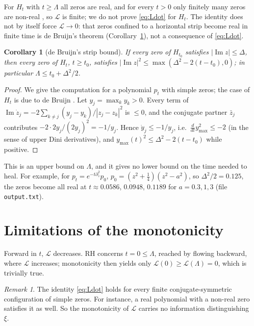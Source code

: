\documentclass[11pt]{amsart}
\newtheorem{corollary}[theorem]{Corollary}
\theoremstyle{definition}
\theoremstyle{remark}
\newtheorem{remark}[theorem]{Remark}
\newcommand{\im}{\operatorname{Im}}
\newcommand{\Lyap}{\mathcal L}
\begin{document}
For $H_t$ with $t\ge\Lambda$ all zeros are real, and for every $t>0$ only finitely many zeros are
non-real \cite{KKL}, so $\Lyap$ is finite; we do not prove \eqref{eq:Ldot} for $H_t$. The identity does not
by itself force $\Lyap\to0$: that zeros confined to a horizontal strip become real in finite time is de Bruijn's
theorem \cite{dB} (Corollary~\ref{cor:height}), not a consequence of \eqref{eq:Ldot}.

\begin{corollary}[de Bruijn's strip bound]\label{cor:height}
If every zero of $H_{t_0}$ satisfies $|\im z|\le\Delta$, then every zero of $H_t$, $t\ge t_0$, satisfies
$|\im z|^2\le\max(\Delta^2-2(t-t_0),0)$; in particular $\Lambda\le t_0+\Delta^2/2$.
\end{corollary}

\begin{proof}
We give the computation for a polynomial $p_t$ with simple zeros; the case of $H_t$ is due to de Bruijn
\cite{dB}. Let $y_j=\max_k y_k>0$. Every term of $\im\dot z_j=-2\sum_{k\ne j}(y_j-y_k)/|z_j-z_k|^2$ is
$\le0$, and the conjugate partner $\bar z_j$ contributes $-2\cdot 2y_j/(2y_j)^2=-1/y_j$. Hence
$\dot y_j\le-1/y_j$, i.e.\ $\frac{d}{dt}y_{\max}^2\le-2$ (in the sense of upper Dini derivatives), and
$y_{\max}(t)^2\le\Delta^2-2(t-t_0)$ while positive.
\end{proof}

This is an upper bound on $\Lambda$, and it gives no lower bound on the time needed to heal. For example,
for $p_t=e^{-t\partial_z^2}p_0$, $p_0=(z^2+\frac14)(z^2-a^2)$, so $\Delta^2/2=0.125$, the zeros become all real
at $t\approx0.0586$, $0.0948$, $0.1189$ for $a=0.3,1,3$ (file \texttt{output.txt}).

\section{Limitations of the monotonicity}\label{sec:nogo}

Forward in $t$, $\Lyap$ decreases. RH concerns $t=0\le\Lambda$, reached by flowing backward, where $\Lyap$
increases; monotonicity then yields only $\Lyap(0)\ge\Lyap(\Lambda)=0$, which is trivially true.

\begin{remark}\label{thm:nogo}
The identity \eqref{eq:Ldot} holds for every finite conjugate-symmetric configuration of simple zeros. For
instance, a real polynomial with a non-real zero satisfies it as well. So the monotonicity of $\Lyap$ carries
no information distinguishing $\xi$.
\end{remark}
\end{document}
